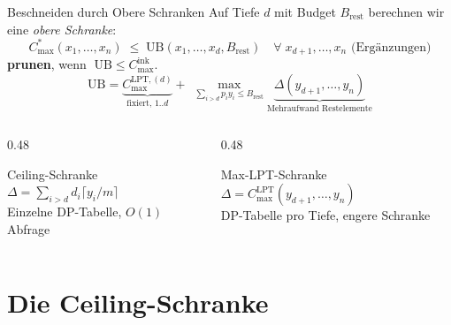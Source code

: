 \documentclass[fleqn,11pt,aspectratio=43]{beamer}
\newcommand{\Copt}{C_{\max}^{*}}
\newcommand{\Clpt}{C_{\max}^{\mathrm{LPT}}}
\newcommand{\Cinc}{C_{\max}^{\mathrm{ink}}}
\newcommand{\Brem}{B_{\mathrm{rest}}}
\newcommand{\UB}{\mathrm{UB}}
\begin{document}
\begin{frame}[shrink=10]{Beschneiden durch Obere Schranken}
  Auf Tiefe $d$ mit Budget $\Brem$ berechnen wir eine \emph{obere Schranke}:
  \[\Copt(x_1,\ldots,x_n)\;\leq\;\UB(x_1,\ldots,x_d,\Brem)
    \quad\forall\;x_{d+1},\ldots,x_n\text{ (Ergänzungen)}\]
  \textbf{prunen}, wenn $\;\UB\leq\Cinc$.
  \[
    \UB = \underbrace{C_{\max}^{\mathrm{LPT},(d)}}_{\text{fixiert, 1..}d}
         +\;\max_{\sum_{i>d}p_iy_i\leq\Brem}
           \underbrace{\Delta(y_{d+1},\ldots,y_n)}_{\text{Mehraufwand Restelemente}}
  \]
  \begin{columns}[T]
    \begin{column}{0.48\textwidth}
      \begin{block}{Ceiling-Schranke}
        $\Delta = \sum_{i>d}d_i\lceil y_i/m\rceil$\\
        Einzelne DP-Tabelle, $O(1)$ Abfrage
      \end{block}
    \end{column}
    \begin{column}{0.48\textwidth}
      \begin{block}{Max-LPT-Schranke}
        $\Delta = \Clpt(y_{d+1},\ldots,y_n)$\\
        DP-Tabelle pro Tiefe, engere Schranke
      \end{block}
    \end{column}
  \end{columns}
\end{frame}

\section{Die Ceiling-Schranke}
\end{document}
